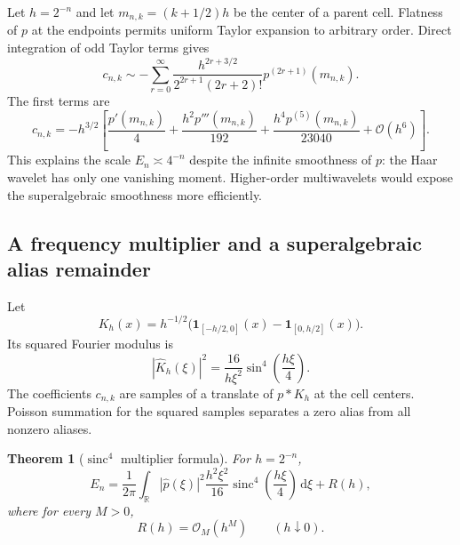 \documentclass[11pt,oneside]{article}
\newtheorem{theorem}{Theorem}[section]
\theoremstyle{definition}
\theoremstyle{remark}
\newcommand{\R}{\mathbb R}
\newcommand{\sinc}{\operatorname{sinc}}
\newcommand{\dd}{\,\mathrm d}
\newcommand{\bigO}{\mathcal O}
\newcommand{\one}{\mathbf 1}
\begin{document}
Let $h=2^{-n}$ and let $m_{n,k}=(k+1/2)h$ be the center of a parent cell.
Flatness of $p$ at the endpoints permits uniform Taylor expansion to arbitrary
order.  Direct integration of odd Taylor terms gives
\begin{equation}\label{eq:c-local-asymptotic}
 c_{n,k}\sim-
 \sum_{r=0}^\infty
 \frac{h^{2r+3/2}}{2^{2r+1}(2r+2)!}
 p^{(2r+1)}(m_{n,k}).
\end{equation}
The first terms are
\begin{equation}\label{eq:c-local-first}
 c_{n,k}=-h^{3/2}\left[
 \frac{p'(m_{n,k})}{4}
 +\frac{h^2p'''(m_{n,k})}{192}
 +\frac{h^4p^{(5)}(m_{n,k})}{23040}
 +\bigO(h^6)
 \right].
\end{equation}
This explains the scale $E_n\asymp4^{-n}$ despite the infinite smoothness of
$p$: the Haar wavelet has only one vanishing moment.  Higher-order multiwavelets
would expose the superalgebraic smoothness more efficiently.

\subsection{A frequency multiplier and a superalgebraic alias remainder}

Let
\begin{equation}\label{eq:Kh-def}
 K_h(x)=h^{-1/2}
 \bigl(\one_{[-h/2,0]}(x)-\one_{[0,h/2]}(x)\bigr).
\end{equation}
Its squared Fourier modulus is
\begin{equation}\label{eq:Kh-transform}
 |\widehat K_h(\xi)|^2
 =\frac{16}{h\xi^2}\sin^4\!\left(\frac{h\xi}{4}\right).
\end{equation}
The coefficients $c_{n,k}$ are samples of a translate of $p*K_h$ at the cell
centers.  Poisson summation for the squared samples separates a zero alias from
all nonzero aliases.

\begin{theorem}[$\sinc^4$ multiplier formula]
\label{thm:sinc4-energy}
For $h=2^{-n}$,
\begin{equation}\label{eq:En-multiplier}
 E_n=\frac1{2\pi}\int_\R|\widehat p(\xi)|^2
 \frac{h^2\xi^2}{16}\sinc^4\!\left(\frac{h\xi}{4}\right)\dd\xi
 +R(h),
\end{equation}
where for every $M>0$,
\begin{equation}\label{eq:alias-superalgebraic}
 R(h)=\bigO_M(h^M)\qquad(h\downarrow0).
\end{equation}
\end{theorem}
\end{document}
